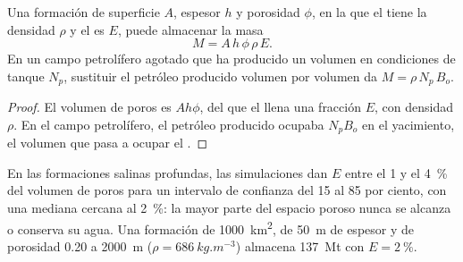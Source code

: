 \begin{omfigure}
\begin{minipage}[b]{0.49\linewidth}
\end{minipage}
\par{}
\end{omfigure}

\begin{proposition}\label{prop:b2:energy-geology:capacity}
Una formación de superficie $A$, espesor $h$ y porosidad $\phi$, en la que el  tiene la densidad $\rho$
y el  es $E$, puede almacenar la masa
\begin{equation}
M = A\,h\,\phi\,\rho\,E .
\label{eq:b2:energy-geology:capacity}
\end{equation}
En un campo petrolífero agotado que ha producido un volumen en condiciones de tanque $N_p$, sustituir el petróleo producido
volumen por volumen da $M = \rho\,N_p\,B_o$.
\end{proposition}

\begin{proof}
El volumen de poros es $Ah\phi$, del que el  llena una fracción $E$, con densidad $\rho$. En el
campo petrolífero, el petróleo producido ocupaba $N_pB_o$ en el yacimiento, el volumen que pasa a ocupar el .
\end{proof}

En las formaciones salinas profundas, las simulaciones dan $E$ entre el 1 y el \qty{4}{\percent} del volumen de poros
para un intervalo de confianza del 15 al 85 por ciento, con una mediana cercana al \qty{2}{\percent}: la mayor parte del espacio
poroso nunca se alcanza o conserva su agua. Una formación de \qty{1000}{km^2}, de \qty{50}{m} de espesor y de
porosidad 0.20 a \qty{2000}{m} ($\rho = \qty{686}{kg.m^{-3}}$) almacena \qty{137}{Mt} con $E =
\qty{2}{\percent}$.

